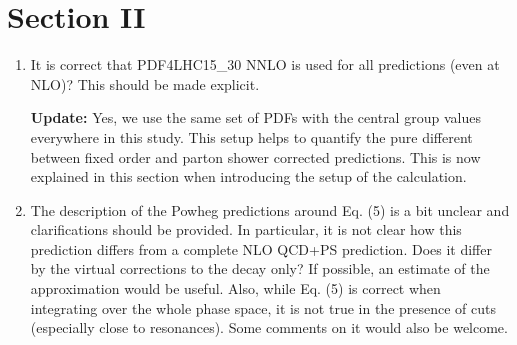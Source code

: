 \documentclass[12pt]{article}
\begin{document}
\section*{Section II}
\begin{enumerate}
\item It is correct that PDF4LHC15\_30 NNLO is used for all predictions (even at NLO)? This should be made explicit.

{\bf Update:} Yes, we use the same set of PDFs with the central group values everywhere in this study. This setup helps to quantify the pure different between fixed order and parton shower corrected predictions. This is now explained in this section when introducing the setup of the calculation. 

\item The description of the Powheg predictions around Eq. (5) is a bit unclear and clarifications should be provided. In particular, it is not clear how this prediction differs from a complete NLO QCD+PS prediction. Does it differ by the virtual corrections to the decay only? If possible, an estimate of the approximation would be useful. Also, while Eq. (5) is correct when integrating over the whole phase space, it is not true in the presence of cuts (especially close to resonances). Some comments on it would also be welcome.
\end{enumerate}
\end{document}
